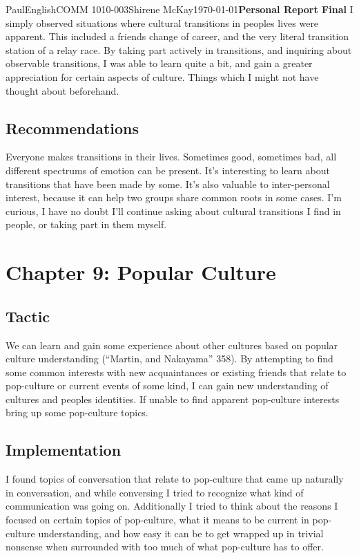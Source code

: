\documentclass[12pt,letterpaper]{article}
\begin{document}
\begin{mla}{Paul}{English}{COMM 1010-003}{Shirene
    McKay}{\today}{\textbf{Personal Report Final}}
I simply observed situations where cultural transitions in peoples lives were apparent. This included a friends change of career, and the very literal transition station of a relay race. By taking part actively in transitions, and inquiring about observable transitions, I was able to learn quite a bit, and gain a greater appreciation for certain aspects of culture. Things which I might not have thought about beforehand.

\subsection{Recommendations}

Everyone makes transitions in their lives. Sometimes good, sometimes bad, all different spectrums of emotion can be present. It's interesting to learn about transitions that have been made by some. It's also valuable to inter-personal interest, because it can help two groups share common roots in some cases. I'm curious, I have no doubt I'll continue asking about cultural transitions I find in people, or taking part in them myself.

\section{Chapter 9: Popular Culture}

\subsection{Tactic}

We can learn and gain some experience about other cultures based on popular culture understanding (``Martin, and Nakayama'' 358). By attempting to find some common interests with new acquaintances or existing friends that relate to pop-culture or current events of some kind, I can gain new understanding of cultures and peoples identities. If unable to find apparent pop-culture interests bring up some pop-culture topics.

\subsection{Implementation}

I found topics of conversation that relate to pop-culture that came up naturally in conversation, and while conversing I tried to recognize what kind of communication was going on. Additionally I tried to think about the reasons I focused on certain topics of pop-culture, what it means to be current in pop-culture understanding, and how easy it can be to get wrapped up in trivial nonsense when surrounded with too much of what pop-culture has to offer.


\end{mla}
\end{document}
